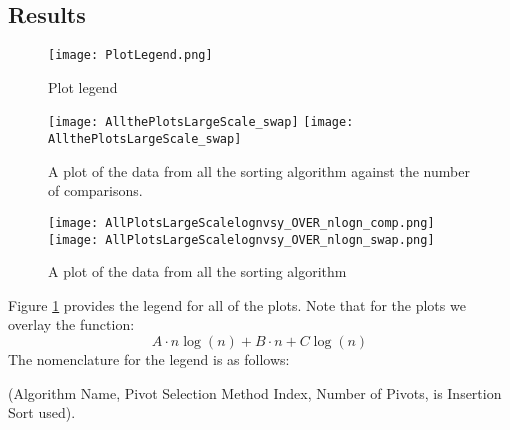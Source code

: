 	\subsection{Results}
	\begin{figure}[ht!]
		\begin{center}   
			\texttt{[image: PlotLegend.png]}
			\caption{Plot legend}
			\label{fig:PlotLegend}
		\end{center}
	\end{figure}

	\begin{figure}[ht!]
		\begin{center}
			\texttt{[image: AllthePlotsLargeScale\_swap]}
			\texttt{[image: AllthePlotsLargeScale\_swap]}
			\caption{A plot of the data from all the sorting algorithm against the number of comparisons.}
			\label{fig:AllSorts}
		\end{center}
	\end{figure}


	\begin{figure}[ht!]
		\begin{center}
			\texttt{[image: AllPlotsLargeScalelognvsy\_OVER\_nlogn\_comp.png]}
			\texttt{[image: AllPlotsLargeScalelognvsy\_OVER\_nlogn\_swap.png]}
			\caption{A plot of the data from all the sorting algorithm}
			\label{fig:AllSortsLog}
		\end{center}
	\end{figure}

	Figure \ref{fig:PlotLegend} provides the legend for all of the plots. Note that for the plots we overlay the function:
	\begin{equation}
		A\cdot n\log(n) + B\cdot n + C \log(n)
		\label{eq:FitFunction}
	\end{equation}
	The nomenclature for the legend is as follows: 
	\begin{center}
		(Algorithm Name, Pivot Selection Method Index, Number of Pivots, is Insertion Sort used).
	\end{center}
	

